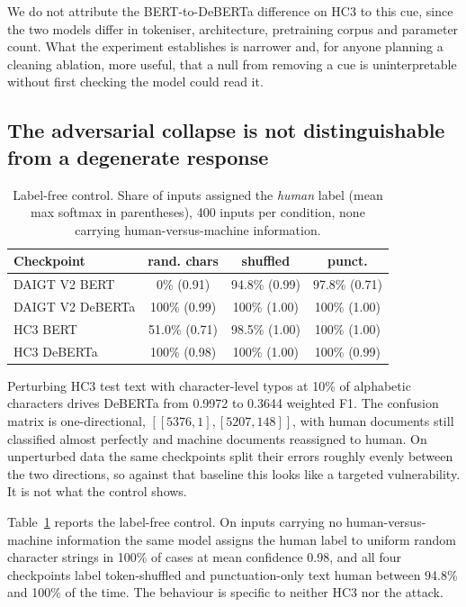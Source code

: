 \documentclass[conference,a4paper]{IEEEtran}
\begin{document}
We do not attribute the BERT-to-DeBERTa difference on HC3 to this cue, since the two models differ in tokeniser, architecture, pretraining corpus and parameter count. What the experiment establishes is narrower and, for anyone planning a cleaning ablation, more useful, that a null from removing a cue is uninterpretable without first checking the model could read it.

\subsection{The adversarial collapse is not distinguishable from a degenerate response}
\label{sec:labelfree}

\begin{table}[!ht]
\centering
\caption{Label-free control. Share of inputs assigned the \emph{human} label (mean max softmax in parentheses), 400 inputs per condition, none carrying human-versus-machine information.}
\label{tab:labelfree}
\footnotesize
\setlength{\tabcolsep}{3.5pt}
\begin{tabular}{@{}lccc@{}}
\toprule
Checkpoint & rand. chars & shuffled & punct. \\
\midrule
DAIGT V2 BERT & 0\% (0.91) & 94.8\% (0.99) & 97.8\% (0.71) \\
DAIGT V2 DeBERTa & 100\% (0.99) & 100\% (1.00) & 100\% (1.00) \\
HC3 BERT & 51.0\% (0.71) & 98.5\% (1.00) & 100\% (1.00) \\
HC3 DeBERTa & 100\% (0.98) & 100\% (1.00) & 100\% (0.99) \\
\bottomrule
\end{tabular}
\end{table}

Perturbing HC3 test text with character-level typos at 10\% of alphabetic characters drives DeBERTa from 0.9972 to 0.3644 weighted F1. The confusion matrix is one-directional, $[[5376, 1], [5207, 148]]$, with human documents still classified almost perfectly and machine documents reassigned to human. On unperturbed data the same checkpoints split their errors roughly evenly between the two directions, so against that baseline this looks like a targeted vulnerability. It is not what the control shows.

Table~\ref{tab:labelfree} reports the label-free control. On inputs carrying no human-versus-machine information the same model assigns the human label to uniform random character strings in 100\% of cases at mean confidence 0.98, and all four checkpoints label token-shuffled and punctuation-only text human between 94.8\% and 100\% of the time. The behaviour is specific to neither HC3 nor the attack.
\end{document}
